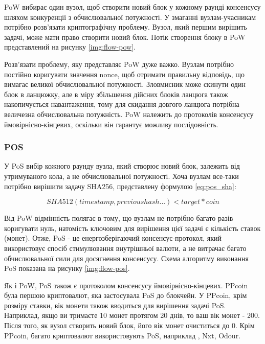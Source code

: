 \documentclass{lib/styles/default-style}
\begin{document}
    PoW вибирає один вузол, щоб створити новий блок у кожному раунді консенсусу шляхом конкуренції з
    обчислювальної потужності. У змаганні вузлам-учасникам потрібно розв'язати криптографічну проблему.
    Вузол, який першим вирішить задачі, може мати право створити новий блок.
    Потік створення блоку в PoW представлений на рисунку \ref{img:flow-pow}.


    Розв'язати проблему, яку представляє PoW дуже важко.
    Вузлам потрібно постійно коригувати значення nonce, щоб отримати правильну відповідь,
    що вимагає великої обчислювальної потужності.
    Зловмисник може скинути один блок в ланцюжку, але в міру збільшення дійсних блоків ланцюга
    також накопичується навантаження, тому для скидання довгого ланцюга потрібна величезна обчислювальна потужність.
    PoW належить до протоколів консенсусу ймовірнісно-кінцевих, оскільки він гарантує можливу послідовність.


    \subsubsection{POS}

    У PoS вибір кожного раунду вузла, який створює новий блок, залежить від утримуваного кола, а не обчислювальної потужності.
    Хоча вузлам все-таки потрібно вирішити задачу SHA256, представлену формулою \ref{eq:pos_sha}:

    \begin{equation}
        SHA512(timestamp, previous hash...) < target*coin
        \label{eq:pos_sha}
    \end{equation}

    Від PoW відмінність полягає в тому, що вузлам не потрібно багато разів коригувати нуль,
    натомість ключовим для вирішення цієї задачі є кількість ставок (монет).
    Отже, PoS - це енергозберігаючий консенсус-протокол, який використовує спосіб стимулювання внутрішньої валюти,
    а не витрачає багато обчислювальної сили для досягнення консенсусу.
    Схема алгоритму виконання PoS показана на рисунку \ref{img:flow-pos}.
      

    Як і PoW, PoS також є протоколом консенсусу ймовірнісно-кінцевих.
    PPcoin була першою криптовалют, яка застосувала PoS до блокчейн.
    У PPcoin, крім розміру ставки, вік монети також вводиться для вирішення задачі PoS.
    Наприклад, якщо ви тримаєте 10 монет протягом 20 днів, то ваш вік монет - 200.
    Після того, як вузол створить новий блок, його вік монет очиститься до 0.
    Крім PPcoin, багато криптовалют використовують PoS, наприклад , Nxt, Odour.
\end{document}
